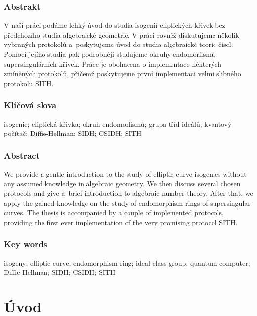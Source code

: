 \documentclass[12pt]{report}
\begin{document}
\subsection*{Abstrakt}
V naší práci podáme lehký úvod do studia isogenií eliptických křivek bez předchozího studia algebraické geometrie. V práci rovněž diskutujeme několik vybraných protokolů a~poskytujeme úvod do studia algebraické teorie čísel. Pomocí jejího studia pak podrobněji studujeme okruhy endomorfismů supersingulárních křivek. Práce je obohacena o implementace některých zmíněných protokolů, přičemž poskytujeme první implementaci velmi slibného protokolu SITH.


\subsection*{Klíčová slova}
isogenie; eliptická křivka; okruh endomorfismů; grupa tříd ideálů; kvantový počítač; Diffie-Hellman; SIDH; CSIDH; SITH


\vspace*{4cm}

\subsection*{Abstract}
We provide a gentle introduction to the study of elliptic curve isogenies without any assumed knowledge in algebraic geometry. We then discuss several chosen protocols and give a~brief introduction to algebraic number theory. After that, we apply the gained knowledge on the study of endomorphism rings of supersingular curves. The thesis is accompanied by a couple of implemented protocols, providing the first ever implementation of the very promising protocol SITH.

\subsection*{Key words}
isogeny; elliptic curve; endomorphism ring; ideal class group; quantum computer; Diffie-Hellman; SIDH; CSIDH; SITH





{
\hypersetup{linkcolor=black}
\tableofcontents
}
\thispagestyle{empty}

\chapter*{Úvod}
\end{document}

